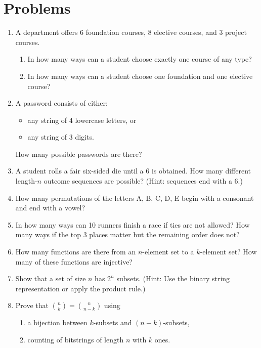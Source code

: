 \section*{Problems}

\begin{enumerate}

\item 
A department offers 6 foundation courses, 8 elective courses, and 3 project courses.  
\begin{enumerate}
    \item In how many ways can a student choose exactly one course of any type?  
    \item In how many ways can a student choose one foundation and one elective course?  
\end{enumerate}
\item 
A password consists of either:
\begin{itemize}
    \item any string of 4 lowercase letters, or
    \item any string of 3 digits.
\end{itemize}
How many possible passwords are there?

\item 
A student rolls a fair six-sided die until a 6 is obtained.  
How many different length-$n$ outcome sequences are possible?  
(Hint: sequences end with a 6.)


\item 
How many permutations of the letters A, B, C, D, E begin with a consonant and end with a vowel?

\item  
In how many ways can 10 runners finish a race if ties are not allowed?  
How many ways if the top 3 places matter but the remaining order does not?

\item  
How many functions are there from an $n$-element set to a $k$-element set?  
How many of these functions are injective?

\item 
Show that a set of size $n$ has $2^n$ subsets.  
(Hint: Use the binary string representation or apply the product rule.)

\item 
Prove that $\binom{n}{k} = \binom{n}{n-k}$ using  
\begin{enumerate}
    \item a bijection between $k$-subsets and $(n-k)$-subsets,  
    \item counting of bitstrings of length $n$ with $k$ ones.
\end{enumerate}


\end{enumerate}
